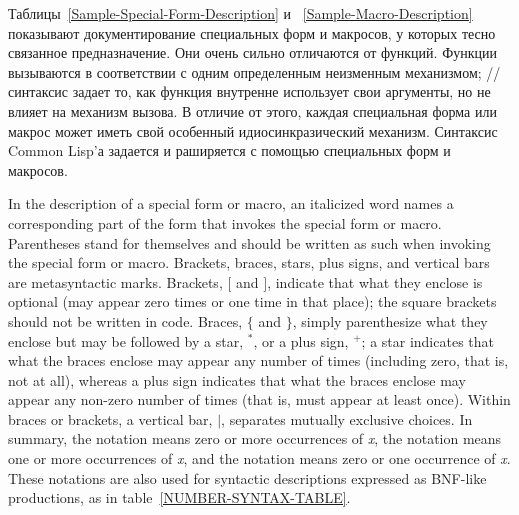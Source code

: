 Таблицы~\ref{Sample-Special-Form-Description} и ~\ref{Sample-Macro-Description}
показывают документирование специальных форм и макросов, у которых тесно
связанное предназначение.
Они очень сильно отличаются от функций.
Функции вызываются в соответствии с одним определенным неизменным механизмом;
// синтаксис задает то, как функция
внутренне использует свои аргументы, но не влияет на механизм вызова.
В отличие от этого, каждая специальная форма или макрос может иметь свой
особенный идиосинкразический механизм. Синтаксис Common Lisp'а задается и
раширяется с помощью специальных форм и макросов.

In the description of a special form or macro, an italicized word names a
corresponding part of the form that invokes the special form or macro.
Parentheses stand for themselves and should be
written as such when invoking the special form or macro.
Brackets, braces, stars, plus signs, and vertical bars are metasyntactic
marks. 
Brackets,
$\lbrack$ and $\rbrack$, indicate that what they enclose is optional
(may appear zero times or one time in that place); the square
brackets should not be written in code.
Braces, $\lbrace$ and $\rbrace$, simply parenthesize what they enclose
but may be followed by a star, ${}^*$, or a plus sign, ${}^+$;
a star indicates that what the braces enclose may appear any number of times
(including zero, that is, not at all), whereas a plus sign indicates
that what the braces enclose may appear any non-zero number of times
(that is, must appear at least once).  Within braces or brackets,
a vertical bar, $|$, separates mutually exclusive choices.
In summary, the notation  means zero or more occurrences
of \textit{x}, the notation  means one or more occurrences
of \textit{x}, and the notation  means zero or one occurrence
of \textit{x}.  These notations are also used for syntactic
descriptions expressed as BNF-like productions, as
in table~\ref{NUMBER-SYNTAX-TABLE}.

